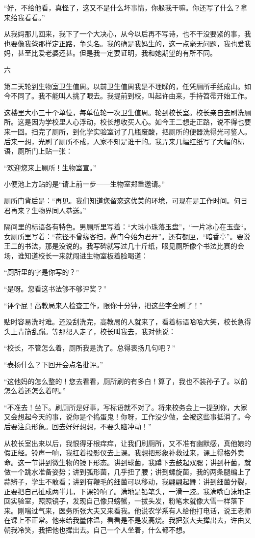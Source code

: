  “好，不给他看，真怪了，这又不是什么坏事情，你躲我干嘛。你还写了什么？拿来给我看看。” 
 
 从我妈那儿回来，我下了一个大决心，从今以后再不写诗，也不干没要紧的事，我也要像我爸那样定正路，争头名。我的确是我妈生的，这一点毫无问题，我也爱我妈，甚至比爱老婆还甚。但是我一定要证明，我和她期望的有所不同。 
 
 六 
 
 第二天轮到生物室卫生值周。以前卫生值周我是不理睬的，任凭厕所手纸成山。如今不同了。我不能叫人挑了眼去。我提前到校，叫起许由来，手持笤帚开始工作。 
 
 这楼里大小三十个单位，每单位轮一次卫生值周。轮到校长室。校长亲自去刷洗厕所。这是因为学校里人心浮动，校长想收买人心。如今王二想走正路，说不得也要来一回。扫完了厕所，到化学实验室讨了几瓶废酸，把厕所的便器洗得光可鉴人。后来一想，光刷了厕所不成，人家不知是谁干的。我弄来几幅红纸写了大幅的标语，厕所门上贴一张： 
 
 “欢迎您来上厕所！生物室宣。” 
 
 小便池上方贴的是“请上前一步——生物室郑重邀请。” 
 
 厕所门背后是：“再见。我们知道您留恋这优美的环境，可现在是工作时间。何日君再来？生物界同人恭送。” 
 
 隔间里的标语各有特色。男厕所里写着：“大珠小珠落玉盘”，“一片冰心在玉壶“。女厕所里写着：“花径不曾缘客扫，蓬门今始为君开”。还有额匣，“暗香亭”。要说王二的书法，那是没说的。我写碑就写过几十斤纸，眼见厕所像个书法比赛的会场，谁知道校长一来就闯进生物室板着脸喝道： 
 
 “厕所里的字是你写的？” 
 
 “是呀。您看这书法够不够评奖？” 
 
 “评个屁！高教局来人检查工作，限你十分钟，把这些字全刷了！” 
 
 贴时容易洗时难。还没刮洗完，高教局的人就来了，看着标语哈哈大笑，校长急得头上青筋乱蹦。等那帮人走了，校长叫我去，我对他说： 
 
 “校长，不管怎么着，厕所我是洗了。总得表扬几句吧？” 
 
 “表扬什么？下回开会点名批评。” 
 
 “这他妈的怎么整的！您去看看，厕所刷的有多白！算了，我也不装孙子了。以前怎么着还怎么着吧。” 
 
 “不准去！坐下。刷厕所是好事，写标语就不对了。将来校务会上一提到你，大家又会想起今天的事，说你是个捣蛋鬼！你呀，工作没少做，全被这些事抵消了。今后要注意形象。回去好好想想，不要头脑冲动！” 
 
 从校长室出来以后，我恨得牙根痒痒，让我们刷厕所，又不准有幽默感，真他娘的假正经。铃声一响，我扛着投影仪去上课。我想把形象补救过来，课上得格外卖命。这一节讲到微生物的镜下形态。讲到球菌，我蹲下去鼓起双腮；讲到杆菌，就做一个跳水准备姿势；讲到弧形菌，几乎扭了腰；讲到螺旋菌，我的两条腿编上了蒜辫子，学生不敢看；讲到有鞭毛的细菌可以移动，我翩翩起舞：讲到细菌分裂，正要把自己扯成两半儿，下课铃响了。满地是铅笔头，一滑一跤。我满嘴白沫地走回实验室，照照镜子，发现自己像只螃蟹，一拔头发，粉笔末就像大雪一样落下来。刚喘过气来，医务所张大夫又来看我。他说农学系有人给他打电话，说王老师在课上不正常。他来给我量体温，看看是不是发高烧。我把张大夫撵出去，许由又朝我冷笑，我把他也撵出去。自己一个人坐着，什么都不想。 
 
